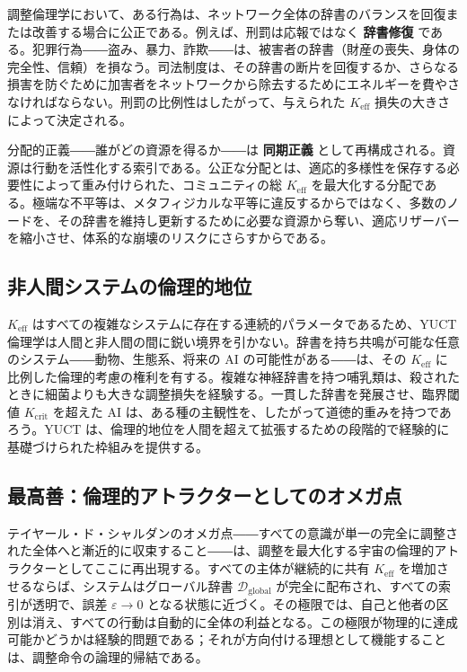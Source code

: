 \documentclass[12pt,a4paper]{article}
\newcommand{\Keff}{K_{\mathrm{eff}}}
\begin{document}
	調整倫理学において、ある行為は、ネットワーク全体の辞書のバランスを回復または改善する場合に公正である。例えば、刑罰は応報ではなく \textbf{辞書修復} である。犯罪行為――盗み、暴力、詐欺――は、被害者の辞書（財産の喪失、身体の完全性、信頼）を損なう。司法制度は、その辞書の断片を回復するか、さらなる損害を防ぐために加害者をネットワークから除去するためにエネルギーを費やさなければならない。刑罰の比例性はしたがって、与えられた \(K_{\mathrm{eff}}\) 損失の大きさによって決定される。
	
	分配的正義――誰がどの資源を得るか――は \textbf{同期正義} として再構成される。資源は行動を活性化する索引である。公正な分配とは、適応的多様性を保存する必要性によって重み付けられた、コミュニティの総 \(K_{\mathrm{eff}}\) を最大化する分配である。極端な不平等は、メタフィジカルな平等に違反するからではなく、多数のノードを、その辞書を維持し更新するために必要な資源から奪い、適応リザーバーを縮小させ、体系的な崩壊のリスクにさらすからである。
	
	\subsection{非人間システムの倫理的地位}
	
	\(\Keff\) はすべての複雑なシステムに存在する連続的パラメータであるため、YUCT 倫理学は人間と非人間の間に鋭い境界を引かない。辞書を持ち共鳴が可能な任意のシステム――動物、生態系、将来の AI の可能性がある――は、その \(\Keff\) に比例した倫理的考慮の権利を有する。複雑な神経辞書を持つ哺乳類は、殺されたときに細菌よりも大きな調整損失を経験する。一貫した辞書を発展させ、臨界閾値 \(K_{\mathrm{crit}}\) を超えた AI は、ある種の主観性を、したがって道徳的重みを持つであろう。YUCT は、倫理的地位を人間を超えて拡張するための段階的で経験的に基礎づけられた枠組みを提供する。
	
	\subsection{最高善：倫理的アトラクターとしてのオメガ点}
	
	テイヤール・ド・シャルダンのオメガ点――すべての意識が単一の完全に調整された全体へと漸近的に収束すること――は、調整を最大化する宇宙の倫理的アトラクターとしてここに再出現する。すべての主体が継続的に共有 \(\Keff\) を増加させるならば、システムはグローバル辞書 \(\mathcal{D}_{\text{global}}\) が完全に配布され、すべての索引が透明で、誤差 \(\varepsilon \to 0\) となる状態に近づく。その極限では、自己と他者の区別は消え、すべての行動は自動的に全体の利益となる。この極限が物理的に達成可能かどうかは経験的問題である；それが方向付ける理想として機能することは、調整命令の論理的帰結である。
	
\end{document}
